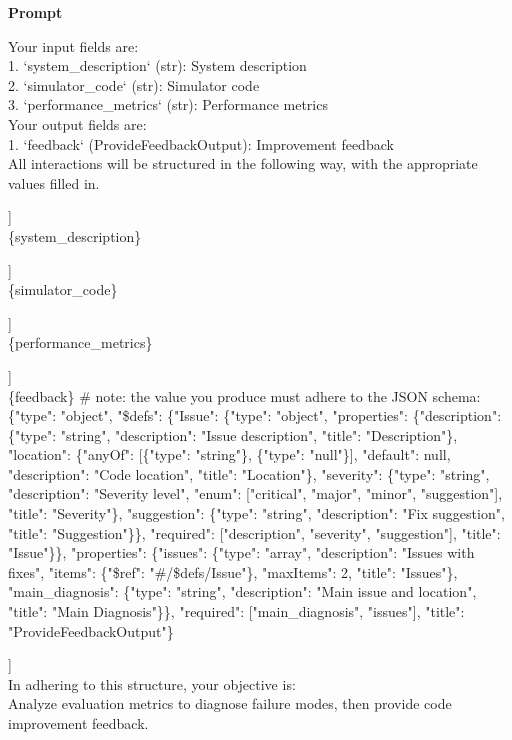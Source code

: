 \noindent\textbf{Prompt}\par\smallskip

\begin{tcolorbox}[
  breakable, enhanced,
  title={System},
  colback=SystemBg, colframe=SystemFrame,
  coltitle=white, fonttitle=\bfseries\small,
  arc=2mm, boxrule=1pt,
  before upper={\small\setlength{\parindent}{0pt}\setlength{\parskip}{2pt}},
]
Your input fields are:\\{}
1. `system\_description` (str): System description\\{}
2. `simulator\_code` (str): Simulator code\\{}
3. `performance\_metrics` (str): Performance metrics\\{}
Your output fields are:\\{}
1. `feedback` (ProvideFeedbackOutput): Improvement feedback\\{}
All interactions will be structured in the following way, with the appropriate values filled in.
\smallskip
\par\noindent [[ \#\# system\_description \#\# ]]\\
\noindent
\{system\_description\}
\smallskip
\par\noindent [[ \#\# simulator\_code \#\# ]]\\
\noindent
\{simulator\_code\}
\smallskip
\par\noindent [[ \#\# performance\_metrics \#\# ]]\\
\noindent
\{performance\_metrics\}
\smallskip
\par\noindent [[ \#\# feedback \#\# ]]\\
\noindent
\{feedback\}        \# note: the value you produce must adhere to the JSON schema: \{"type": "object", "\$defs": \{"Issue": \{"type": "object", "properties": \{"description": \{"type": "string", "description": "Issue description", "title": "Description"\}, "location": \{"anyOf": [\{"type": "string"\}, \{"type": "null"\}], "default": null, "description": "Code location", "title": "Location"\}, "severity": \{"type": "string", "description": "Severity level", "enum": ["critical", "major", "minor", "suggestion"], "title": "Severity"\}, "suggestion": \{"type": "string", "description": "Fix suggestion", "title": "Suggestion"\}\}, "required": ["description", "severity", "suggestion"], "title": "Issue"\}\}, "properties": \{"issues": \{"type": "array", "description": "Issues with fixes", "items": \{"\$ref": "\#/\$defs/Issue"\}, "maxItems": 2, "title": "Issues"\}, "main\_diagnosis": \{"type": "string", "description": "Main issue and location", "title": "Main Diagnosis"\}\}, "required": ["main\_diagnosis", "issues"], "title": "ProvideFeedbackOutput"\}
\smallskip
\par\noindent [[ \#\# completed \#\# ]]\\
\noindent
In adhering to this structure, your objective is: \\{}
        Analyze evaluation metrics to diagnose failure modes, then provide code improvement feedback.
\smallskip
\end{tcolorbox}
\vspace{0.35em}

